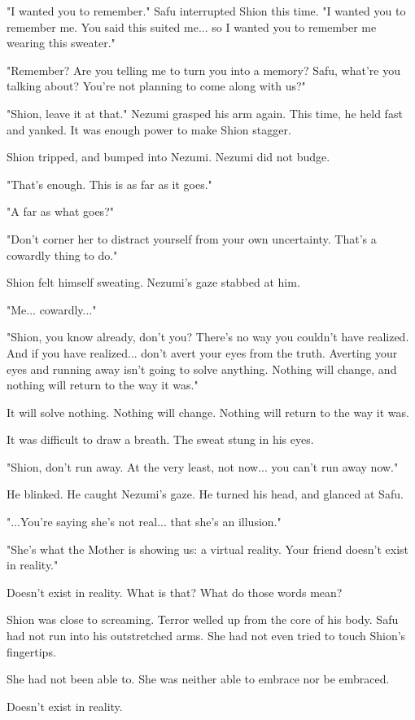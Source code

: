 "I wanted you to remember." Safu interrupted Shion this time. "I wanted
you to remember me. You said this suited me... so I wanted you to
remember me wearing this sweater."

"Remember? Are you telling me to turn you into a memory? Safu, what're
you talking about? You're not planning to come along with us?"

"Shion, leave it at that." Nezumi grasped his arm again. This time, he
held fast and yanked. It was enough power to make Shion stagger.

Shion tripped, and bumped into Nezumi. Nezumi did not budge.

"That's enough. This is as far as it goes."

"A far as what goes?"

"Don't corner her to distract yourself from your own uncertainty. That's
a cowardly thing to do."

Shion felt himself sweating. Nezumi's gaze stabbed at him.

"Me... cowardly..."

"Shion, you know already, don't you? There's no way you couldn't have
realized. And if you have realized... don't avert your eyes from the
truth. Averting your eyes and running away isn't going to solve
anything. Nothing will change, and nothing will return to the way it
was."

It will solve nothing. Nothing will change. Nothing will return to the
way it was.

It was difficult to draw a breath. The sweat stung in his eyes.

"Shion, don't run away. At the very least, not now... you can't run away
now."

He blinked. He caught Nezumi's gaze. He turned his head, and glanced at
Safu.

"...You're saying she's not real... that she's an illusion."

"She's what the Mother is showing us: a virtual reality. Your friend
doesn't exist in reality."

Doesn't exist in reality. What is that? What do those words mean?

Shion was close to screaming. Terror welled up from the core of his
body. Safu had not run into his outstretched arms. She had not even
tried to touch Shion's fingertips.

She had not been able to. She was neither able to embrace nor be
embraced.

Doesn't exist in reality.

